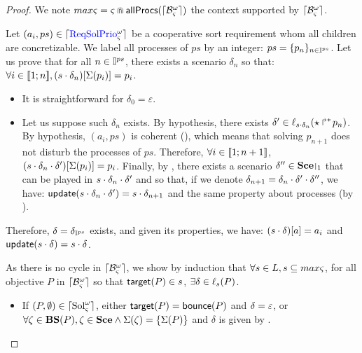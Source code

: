 \begin{proof}
We note $max\varsigma = \varsigma \Cap \mathsf{allProcs}(\lceil \mathcal{B}_\varsigma^\omega\rceil)$ the context supported by $\lceil \mathcal{B}_\varsigma^\omega\rceil$.

Let $(a_i, ps) \in \lceil \textcolor{blue}{\mathrm{ReqSolPrio}}^\omega_\varsigma\rceil$ be a cooperative sort requirement whom all children are concretizable.
We label all processes of $ps$ by an integer: $ps = \{ p_n \}_{n \in \mathbb{I}^{ps}}$.
Let us prove that for all $n \in \mathbb{I}^{ps}$, there exists a scenario $\delta_n$ so that:
$\forall i \in \llbracket 1; n \rrbracket, {(s \cdot \delta_n)[\Sigma(p_i)]} = p_i$.
\begin{itemize}
  \item It is straightforward for $\delta_0 = \varepsilon$.
  \item Let us suppose such $\delta_n$ exists. 
    By hypothesis, there exists $\delta' \in \ell_{s \cdot \delta_n}(\mbox{$\star\Rsh^*\!p_n$})$.
    By hypothesis, $(a_i, ps)$ is coherent (), which means that solving $p_{n+1}$ does not disturb the processes of $ps$.
    Therefore, $\forall i \in \llbracket 1; n+1 \rrbracket$, ${(s \cdot \delta_n \cdot \delta')[\Sigma(p_{i})]} = p_{i}$.
    Finally, by , there exists a scenario $\delta'' \in \restriction{\Sce}{1}$
    that can be played in $s \cdot \delta_n \cdot \delta'$
    and so that, if we denote $\delta_{n+1} = \delta_n \cdot \delta' \cdot \delta''$,
    we have: $\mathsf{update}(s \cdot \delta_n \cdot \delta') = s \cdot \delta_{n+1}$ and the same property about processes (by ).
\end{itemize}
Therefore, $\delta = \delta_{\mathbb{I}^{ps}}$ exists, and given its properties, we have: ${(s \cdot \delta)[a]} = a_i$
and $\mathsf{update}(s \cdot \delta) = s \cdot \delta$.

As there is no cycle in $\lceil \mathcal{B}_\varsigma^\omega\rceil$, we show by induction that $\forall s\in L, s\subseteq max\varsigma$, 
for all objective $P$ in $\lceil \mathcal{B}_\varsigma^\omega\rceil$ so that $\mathsf{target}(P) \in s$,
$\exists \delta \in \ell_s(P)$.%

\begin{itemize}
  \item If $(P, \emptyset) \in \lceil \mathrm{Sol}^\omega_\varsigma\rceil$, either $\mathsf{target}(P) = \mathsf{bounce}(P)$ and $\delta = \varepsilon$,
    or $\forall \zeta \in \mathbf{BS}(P), \zeta \in \mathbf{Sce} \wedge \Sigma(\zeta) = \{ \Sigma(P) \}$ and $\delta$ is given by .


\end{itemize}
\end{proof}
